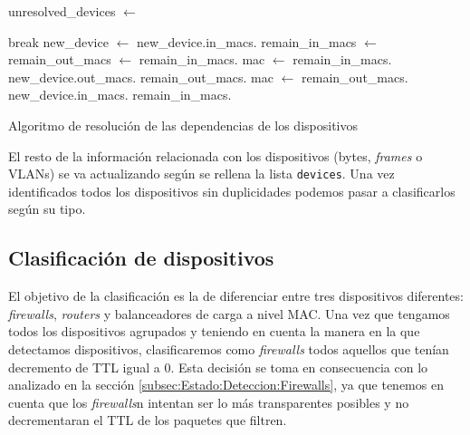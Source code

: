 \documentclass[twoside, 12pt]{epstfg}
\begin{document}
\begin{algorithm}[btp]
\begin{algorithmic}
\State unresolved\_devices $\gets$ 

        \State break
    \EndIf
    \State new\_device $\gets$ 
    \State new\_device.in\_macs.
    \State remain\_in\_macs $\gets$ 
    \State remain\_out\_macs $\gets$ 
    \State remain\_in\_macs.
        \State mac $\gets$ remain\_in\_macs.
            \State new\_device.out\_macs.
            \State remain\_out\_macs.
        \EndFor
            \State mac $\gets$ remain\_out\_macs.
                \State new\_device.in\_macs.
                \State remain\_in\_macs.
            \EndFor
        \EndWhile
    \EndWhile
\EndFor

\EndFunction
\end{algorithmic}
\caption{Algoritmo de resolución de las dependencias de los dispositivos}
\label{lst:AlgoritmoResolucionDispositivos}
\end{algorithm}

El resto de la información relacionada con los dispositivos (bytes, \textit{frames} o VLANs) se va actualizando según se rellena la lista \texttt{devices}. Una vez identificados todos los dispositivos sin duplicidades podemos pasar a clasificarlos según su tipo.

\subsection{Clasificación de dispositivos}
El objetivo de la clasificación es la de diferenciar entre tres dispositivos diferentes: \textit{firewalls}, \textit{routers} y balanceadores de carga a nivel MAC. Una vez que tengamos todos los dispositivos agrupados y teniendo en cuenta la manera en la que detectamos dispositivos, clasificaremos como \textit{firewalls} todos aquellos que tenían decremento de TTL igual a 0. Esta decisión se toma en consecuencia con lo analizado en la sección \ref{subsec:Estado:Deteccion:Firewalls}, ya que tenemos en cuenta que los \textit{firewalls}n intentan ser lo más transparentes posibles y no decrementaran el TTL de los paquetes que filtren.
\end{document}
